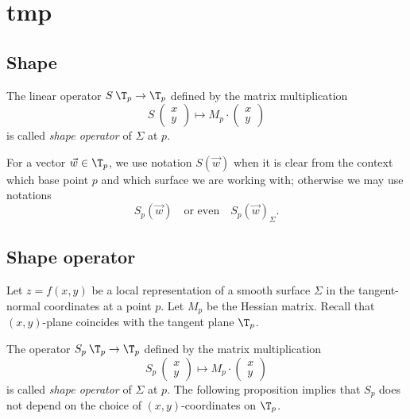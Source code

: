 \chapter{tmp}

\section{Shape}

The linear operator $S\:\T_p\to \T_p$ defined by the matrix multiplication
\[S\:(\begin{smallmatrix}
x\\y
\end{smallmatrix})
\mapsto
M_p\cdot(\begin{smallmatrix}
x\\y
\end{smallmatrix})\] is called \emph{shape operator} of $\Sigma$ at $p$.

For a vector $\vec w\in\T_p$, we use notation $S(\vec w)$ when it is clear from the context which base point $p$ and which surface we are working with;
otherwise we may use notations 
\[S_p(\vec w)\quad\text{or even}\quad S_p(\vec w)_\Sigma.\]













\section*{Shape operator}

Let $z=f(x,y)$ be a local representation of a smooth surface $\Sigma$ in the tangent-normal coordinates at a point $p$.
Let $M_p$ be the Hessian matrix.
Recall that $(x,y)$-plane coincides with the tangent plane $\T_p$.

The operator $S_p\:\T_p\to \T_p$ defined by the matrix multiplication
\[S_p\:(\begin{smallmatrix}
x\\y
\end{smallmatrix})
\mapsto
M_p\cdot(\begin{smallmatrix}
x\\y
\end{smallmatrix})\] is called \emph{shape operator} of $\Sigma$ at $p$.
The following proposition implies that $S_p$ does not depend on the choice of $(x,y)$-coordinates on $\T_p$.





